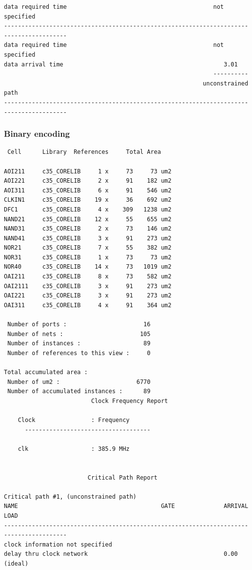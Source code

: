\documentclass[a4paper,11pt]{article}
\begin{document}
\begin{verbatim}
data required time                                          not specified
----------------------------------------------------------------------------------------
data required time                                          not specified
data arrival time                                              3.01
                                                            ----------
                                                         unconstrained path
----------------------------------------------------------------------------------------
\end{verbatim}

\subsubsection{Binary encoding}
\begin{verbatim}
 Cell      Library  References     Total Area

AOI211     c35_CORELIB     1 x     73     73 um2
AOI221     c35_CORELIB     2 x     91    182 um2
AOI311     c35_CORELIB     6 x     91    546 um2
CLKIN1     c35_CORELIB    19 x     36    692 um2
DFC1       c35_CORELIB     4 x    309   1238 um2
NAND21     c35_CORELIB    12 x     55    655 um2
NAND31     c35_CORELIB     2 x     73    146 um2
NAND41     c35_CORELIB     3 x     91    273 um2
NOR21      c35_CORELIB     7 x     55    382 um2
NOR31      c35_CORELIB     1 x     73     73 um2
NOR40      c35_CORELIB    14 x     73   1019 um2
OAI211     c35_CORELIB     8 x     73    582 um2
OAI2111    c35_CORELIB     3 x     91    273 um2
OAI221     c35_CORELIB     3 x     91    273 um2
OAI311     c35_CORELIB     4 x     91    364 um2

 Number of ports :                      16
 Number of nets :                      105
 Number of instances :                  89
 Number of references to this view :     0

Total accumulated area : 
 Number of um2 :                      6770
 Number of accumulated instances :      89
                         Clock Frequency Report

	Clock                : Frequency
      ------------------------------------

	clk                  : 385.9 MHz


                        Critical Path Report

Critical path #1, (unconstrained path)
NAME                                         GATE              ARRIVAL              LOAD
----------------------------------------------------------------------------------------
clock information not specified
delay thru clock network                                       0.00 (ideal)



\end{verbatim}
\end{document}
